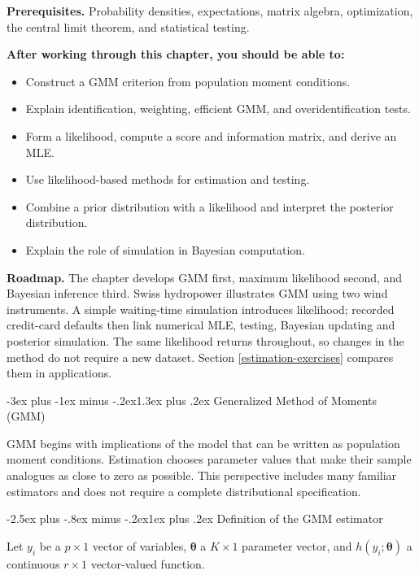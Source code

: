 \documentclass[
  11pt,
]{book}
\makeatletter
\providecommand{\tightlist}{%
  \setlength{\itemsep}{0pt}\setlength{\parskip}{0pt}}
\renewcommand\section{\@startsection{section}{1}{\z@}
  {-3ex plus -1ex minus -.2ex}{1.3ex plus .2ex}
  {\normalfont\Large\bfseries\color{TextbookInk}}}
\renewcommand\subsection{\@startsection{subsection}{2}{\z@}
  {-2.5ex plus -.8ex minus -.2ex}{1ex plus .2ex}
  {\normalfont\large\bfseries\color{TextbookInk}}}
\theoremstyle{definition}
\theoremstyle{definition}
\theoremstyle{definition}
\theoremstyle{definition}
\theoremstyle{remark}
\makeatother
\begin{document}
\textbf{Prerequisites.} Probability densities, expectations, matrix algebra, optimization, the central limit theorem, and statistical testing.

\textbf{After working through this chapter, you should be able to:}

\begin{itemize}
\tightlist
\item
  Construct a GMM criterion from population moment conditions.
\item
  Explain identification, weighting, efficient GMM, and overidentification tests.
\item
  Form a likelihood, compute a score and information matrix, and derive an MLE.
\item
  Use likelihood-based methods for estimation and testing.
\item
  Combine a prior distribution with a likelihood and interpret the posterior distribution.
\item
  Explain the role of simulation in Bayesian computation.
\end{itemize}

\textbf{Roadmap.} The chapter develops GMM first, maximum likelihood second, and Bayesian inference third. Swiss hydropower illustrates GMM using two wind instruments. A simple waiting-time simulation introduces likelihood; recorded credit-card defaults then link numerical MLE, testing, Bayesian updating and posterior simulation. The same likelihood returns throughout, so changes in the method do not require a new dataset. Section \ref{estimation-exercises} compares them in applications.

\section{Generalized Method of Moments (GMM)}\label{secGMM}

GMM begins with implications of the model that can be written as population moment conditions. Estimation chooses parameter values that make their sample analogues as close to zero as possible. This perspective includes many familiar estimators and does not require a complete distributional specification.

\subsection{Definition of the GMM estimator}\label{definition-of-the-gmm-estimator}

Let \(y_i\) be a \(p\times1\) vector of variables, \(\boldsymbol\theta\) a \(K\times1\) parameter vector, and \(h(y_i;\boldsymbol\theta)\) a continuous \(r\times1\) vector-valued function.
\end{document}
